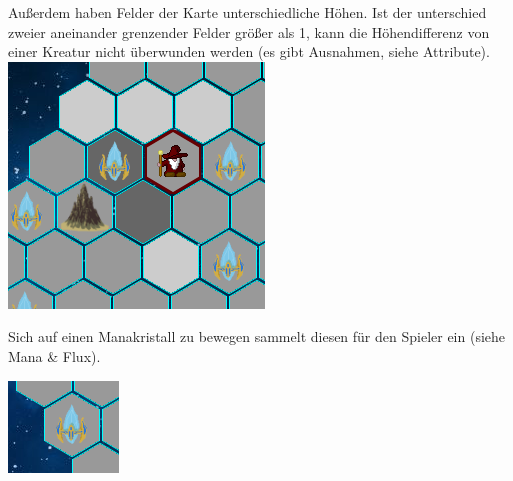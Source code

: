 \documentclass[a4paper,12pt]{scrartcl}
\begin{document}
	Außerdem haben Felder der Karte unterschiedliche Höhen. Ist der unterschied zweier aneinander grenzender Felder größer als 1, kann die Höhendifferenz von einer Kreatur nicht überwunden werden (es gibt Ausnahmen, siehe \glqq Attribute\grqq\hspace{0.05em}).\\
	\includegraphics[width=\textwidth]{Prog2_EA_V2/screenshots/Hoehen.png}
	
	Sich auf einen Manakristall zu bewegen sammelt diesen für den Spieler ein (siehe \glqq Mana \& Flux\grqq\hspace{0.05em}).
	
	\includegraphics[width=\textwidth]{Prog2_EA_V2/screenshots/Manakristall.png}
	
\end{document}
